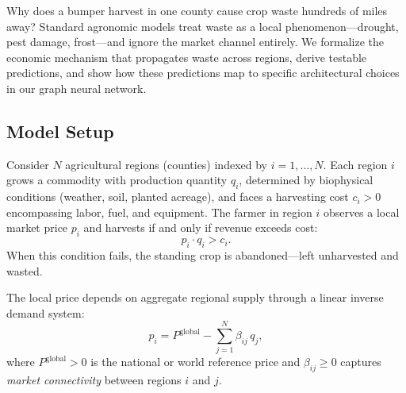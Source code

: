 
Why does a bumper harvest in one county cause crop waste hundreds of miles away?
Standard agronomic models treat waste as a local phenomenon---drought, pest damage, frost---and ignore the market channel entirely.
We formalize the economic mechanism that propagates waste across regions, derive testable predictions, and show how these predictions map to specific architectural choices in our graph neural network.

\subsection{Model Setup}
\label{sec:model_setup}

Consider $N$ agricultural regions (counties) indexed by $i = 1, \ldots, N$.
Each region $i$ grows a commodity with production quantity $q_i$, determined by biophysical conditions (weather, soil, planted acreage), and faces a harvesting cost $c_i > 0$ encompassing labor, fuel, and equipment.
The farmer in region $i$ observes a local market price $p_i$ and harvests if and only if revenue exceeds cost:
\begin{equation}
\label{eq:harvest_condition}
p_i \cdot q_i > c_i.
\end{equation}
When this condition fails, the standing crop is abandoned---left unharvested and wasted.

The local price depends on aggregate regional supply through a linear inverse demand system:
\begin{equation}
\label{eq:price}
p_i = P^{\mathrm{global}} - \sum_{j=1}^{N} \beta_{ij} \, q_j,
\end{equation}
where $P^{\mathrm{global}} > 0$ is the national or world reference price and $\beta_{ij} \geq 0$ captures \emph{market connectivity} between regions $i$ and $j$.

